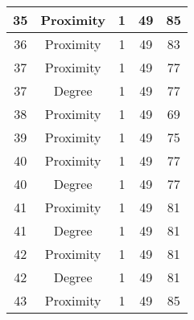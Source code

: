 \documentclass[results.tex]{subfiles}
\begin{document}
\begin{center}
\begin{tabular}{| c || c | c | c | c |}
            \hline
            35                      & Proximity                    & 1                      & 49                      & 85                   \\
            \hline
            36                      & Proximity                    & 1                      & 49                      & 83                   \\
            \hline
            37                      & Proximity                    & 1                      & 49                      & 77                   \\
            \hline
            37                      & Degree                       & 1                      & 49                      & 77                   \\
            \hline
            38                      & Proximity                    & 1                      & 49                      & 69                   \\
            \hline
            39                      & Proximity                    & 1                      & 49                      & 75                   \\
            \hline
            40                      & Proximity                    & 1                      & 49                      & 77                   \\
            \hline
            40                      & Degree                       & 1                      & 49                      & 77                   \\
            \hline
            41                      & Proximity                    & 1                      & 49                      & 81                   \\
            \hline
            41                      & Degree                       & 1                      & 49                      & 81                   \\
            \hline
            42                      & Proximity                    & 1                      & 49                      & 81                   \\
            \hline
            42                      & Degree                       & 1                      & 49                      & 81                   \\
            \hline
            43                      & Proximity                    & 1                      & 49                      & 85                   \\

\end{tabular}
\end{center}
\end{document}

